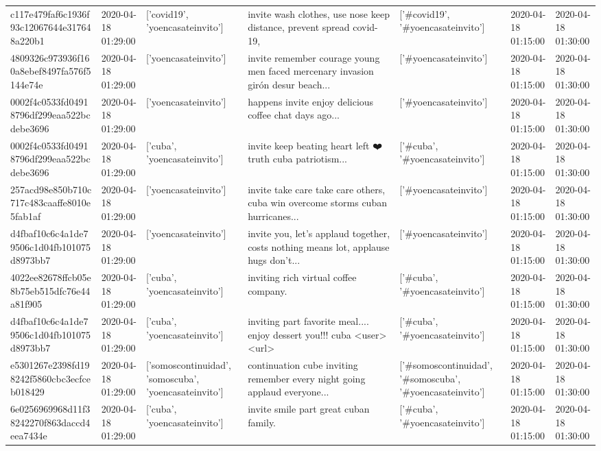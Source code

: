 \begin{tabular}{lllllll}
c117e479faf6c1936f93c12067644e317648a220b1 & 2020-04-18 01:29:00 & ['covid19', 'yoencasateinvito'] & invite wash clothes, use nose keep distance, prevent spread covid-19, & ['#covid19', '#yoencasateinvito'] & 2020-04-18 01:15:00 & 2020-04-18 01:30:00 \\
4809326c973936f160a8ebef8497fa576f5144e74e & 2020-04-18 01:29:00 & ['yoencasateinvito'] & invite remember courage young men faced mercenary invasion girón desur beach... & ['#yoencasateinvito'] & 2020-04-18 01:15:00 & 2020-04-18 01:30:00 \\
0002f4c0533fd04918796df299eaa522bcdebe3696 & 2020-04-18 01:29:00 & ['yoencasateinvito'] & happens invite enjoy delicious coffee chat days ago... & ['#yoencasateinvito'] & 2020-04-18 01:15:00 & 2020-04-18 01:30:00 \\
0002f4c0533fd04918796df299eaa522bcdebe3696 & 2020-04-18 01:29:00 & ['cuba', 'yoencasateinvito'] & invite keep beating heart left ❤️ truth cuba patriotism... & ['#cuba', '#yoencasateinvito'] & 2020-04-18 01:15:00 & 2020-04-18 01:30:00 \\
257acd98e850b710c717c483caaffe8010e5fab1af & 2020-04-18 01:29:00 & ['yoencasateinvito'] & invite take care take care others, cuba win overcome storms cuban hurricanes... & ['#yoencasateinvito'] & 2020-04-18 01:15:00 & 2020-04-18 01:30:00 \\
d4fbaf10c6c4a1de79506c1d04fb101075d8973bb7 & 2020-04-18 01:29:00 & ['yoencasateinvito'] & invite you, let's applaud together, costs nothing means lot, applause hugs don't... & ['#yoencasateinvito'] & 2020-04-18 01:15:00 & 2020-04-18 01:30:00 \\
4022ee82678ffcb05e8b75eb515dfc76e44a81f905 & 2020-04-18 01:29:00 & ['cuba', 'yoencasateinvito'] & inviting rich virtual coffee company. & ['#cuba', '#yoencasateinvito'] & 2020-04-18 01:15:00 & 2020-04-18 01:30:00 \\
d4fbaf10c6c4a1de79506c1d04fb101075d8973bb7 & 2020-04-18 01:29:00 & ['cuba', 'yoencasateinvito'] & inviting part favorite meal.... enjoy dessert you!!! cuba <user> <url> & ['#cuba', '#yoencasateinvito'] & 2020-04-18 01:15:00 & 2020-04-18 01:30:00 \\
e5301267e2398fd198242f5860cbc3ecfceb018429 & 2020-04-18 01:29:00 & ['somoscontinuidad', 'somoscuba', 'yoencasateinvito'] & continuation cube inviting remember every night going applaud everyone... & ['#somoscontinuidad', '#somoscuba', '#yoencasateinvito'] & 2020-04-18 01:15:00 & 2020-04-18 01:30:00 \\
6e0256969968d11f38242270f863daccd4eea7434e & 2020-04-18 01:29:00 & ['cuba', 'yoencasateinvito'] & invite smile part great cuban family. & ['#cuba', '#yoencasateinvito'] & 2020-04-18 01:15:00 & 2020-04-18 01:30:00 \\

\end{tabular}
